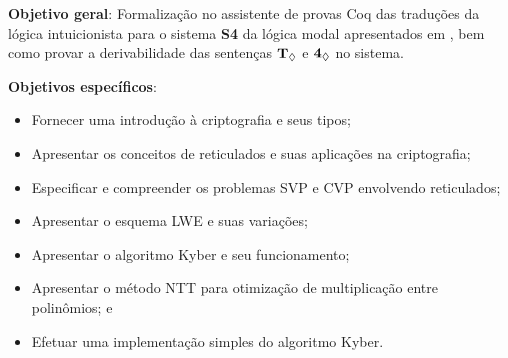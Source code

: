 \textbf{Objetivo geral}: Formalização no assistente de provas Coq das traduções da lógica intuicionista para o sistema \textbf{S4} da lógica modal apresentados em \cite{Troelstra}, bem como provar a derivabilidade das sentenças $\boldsymbol{\text{\textbf{T}}_\Diamond}$ e $\boldsymbol{\text{\textbf{4}}_\Diamond}$ no sistema.

\bigskip

\noindent
\textbf{Objetivos específicos}:
\begin{itemize}
    \item Fornecer uma introdução à criptografia e seus tipos;
    \item Apresentar os conceitos de reticulados e suas aplicações na criptografia;
    \item Especificar e compreender os problemas SVP e CVP envolvendo reticulados;
    \item Apresentar o esquema LWE e suas variações;
    \item Apresentar o algoritmo Kyber e seu funcionamento;
    \item Apresentar o método NTT para otimização de multiplicação entre polinômios; e
    \item Efetuar uma implementação simples do algoritmo Kyber.
\end{itemize}